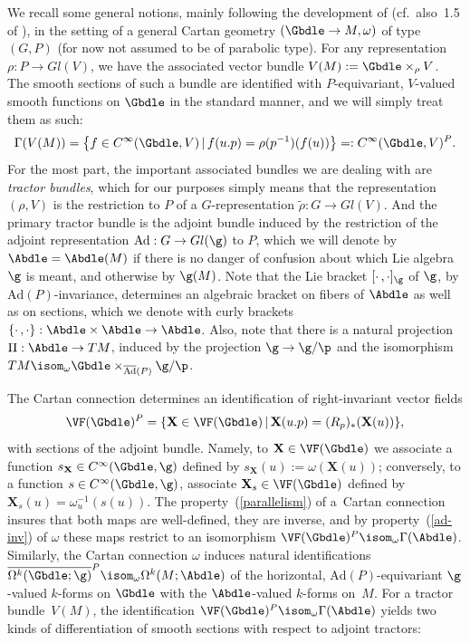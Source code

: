 We recall some general notions, mainly following the development of \cite{Cap inf aut} (cf.\ also~1.5 of \cite{CSbook}), in the setting of a general Cartan geometry $(\Gbdle \rightarrow M,\omega)$ of type $(G,P)$ (for now not assumed to be of parabolic type). For any representation $\rho: P \rightarrow Gl(V)$, we have the associated vector bundle $V(M) := \Gbdle \times_{\rho} V$. The smooth sections of such a bundle are identif\/ied with $P$-equivariant, $V$-valued smooth functions on $\Gbdle$ in the standard manner, and we will simply treat them as such:
\[
\Gamma(V(M)) = \big\{f \in C^{\infty}(\Gbdle,V) \, \vert \, f(u.p) = \rho(p^{-1})(f(u))\big\} =: C^{\infty}(\Gbdle,V)^P.
\]
For the most part, the important associated bundles we are dealing with are \emph{tractor bundles}, which for our purposes simply means that the representation $(\rho,V)$ is the restriction to $P$ of a $G$-representation $\tilde{\rho}:G \rightarrow Gl(V)$. And the primary tractor bundle is the adjoint bundle induced by the restriction of the adjoint representation $\mathrm{Ad}: G \rightarrow Gl(\g)$ to $P$, which we will denote by $\Abdle = \Abdle(M)$ if there is no danger of confusion about which Lie algebra $\g$ is meant, and otherwise by $\g(M)$. Note that the Lie bracket $[\cdot \, ,\cdot]_{\g}$ of $\g$, by $\mathrm{Ad}(P)$-invariance, determines an algebraic bracket on f\/ibers of $\Abdle$ as well as on sections, which we denote with curly brackets $\{\cdot \, ,\cdot\}: \Abdle \times \Abdle \rightarrow \Abdle$. Also, note that there is a natural projection $\Pi: \Abdle \rightarrow TM$, induced by the projection $\g \rightarrow \g/\p$ and the isomorphism $TM \isom_{\omega} \Gbdle \times_{\overline{\mathrm{Ad}}(P)} \g/\p$.

The Cartan connection determines an identif\/ication of right-invariant vector f\/ields
\[
\VF(\Gbdle)^P = \{ \mathbf{X} \in \VF(\Gbdle) \, \vert \, \mathbf{X}(u.p) = (R_p)_* (\mathbf{X}(u))\},
\]
with sections of the adjoint bundle. Namely, to $\mathbf{X} \in \VF(\Gbdle)$ we associate a function $s_{\mathbf{X}} \in C^{\infty}(\Gbdle,\g)$ def\/ined by $s_{\mathbf{X}}(u) := \omega(\mathbf{X}(u))$; conversely, to a function $s \in C^{\infty}(\Gbdle,\g)$, associate $\mathbf{X}_s \in \VF(\Gbdle)$ def\/ined by $\mathbf{X}_s(u) = \omega_u^{-1}(s(u))$. The property~(\ref{parallelism}) of a~Cartan connection insures that both maps are well-def\/ined, they are inverse, and by property~(\ref{ad-inv}) of $\omega$ these maps restrict to an isomorphism $\VF(\Gbdle)^P \isom_{\omega} \Gamma(\Abdle)$. Similarly, the Cartan connection $\omega$ induces natural identif\/ications $\overline{\Omega^k(\Gbdle;\g)}^P \isom_{\omega} \Omega^k(M;\Abdle)$ of the horizontal, $\mathrm{Ad}(P)$-equivariant $\g$-valued $k$-forms on $\Gbdle$ with the $\Abdle$-valued $k$-forms on~$M$. For a tractor bundle~$V(M)$, the identif\/ication $\VF(\Gbdle)^P \isom_{\omega} \Gamma(\Abdle)$ yields two kinds of dif\/ferentiation of smooth sections with respect to adjoint tractors:


